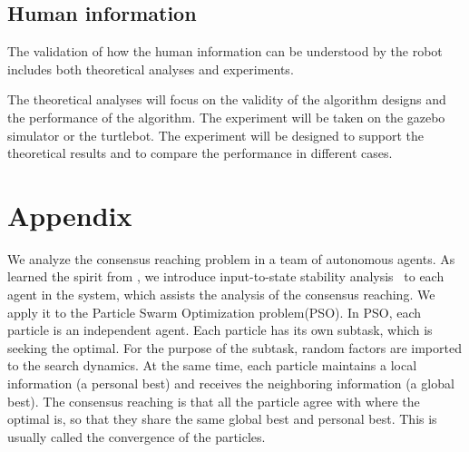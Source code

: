 \documentclass[phd]{byuprop}
\begin{document}

\subsection{Human information}

The validation of how the human information can be understood by the robot includes both theoretical analyses and experiments.

The theoretical analyses will focus on the validity of the algorithm designs and the performance of the algorithm.
The experiment will be taken on the gazebo simulator or the turtlebot.
The experiment will be designed to support the theoretical results and to compare the performance in different cases.

\section{Appendix}

We analyze the consensus reaching problem in a team of autonomous agents.
As learned the spirit from \cite{1470210}, we introduce input-to-state stability analysis~\cite{Jiang2001} to each agent in the system, which assists the analysis of the consensus reaching.
We apply it to the Particle Swarm Optimization problem(PSO).
In PSO, each particle is an independent agent.
Each particle has its own subtask, which is seeking the optimal.
For the purpose of the subtask, random factors are imported to the search dynamics.
At the same time, each particle maintains a local information (a personal best) and receives the neighboring information (a global best).
The consensus reaching is that all the particle agree with where the optimal is, so that they share the same global best and personal best.
This is usually called the convergence of the particles.
\end{document}
